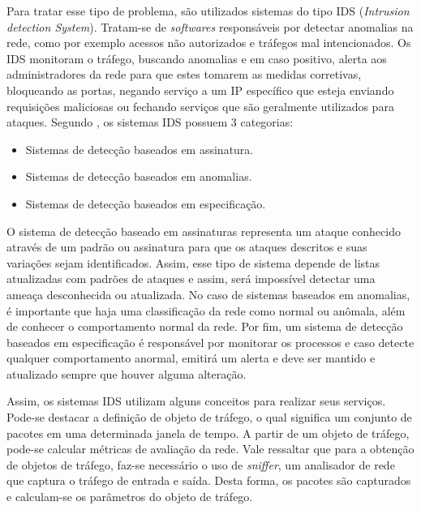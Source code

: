 Para tratar esse tipo de problema, são utilizados sistemas do tipo IDS (\textit{Intrusion detection System}). Tratam-se de \textit{softwares} responsáveis  por detectar anomalias na rede, como por exemplo acessos não autorizados e tráfegos mal intencionados. Os IDS monitoram o tráfego, buscando anomalias e em caso positivo, alerta aos administradores da rede para que estes tomarem as medidas corretivas, bloqueando as portas, negando serviço a um IP específico que esteja enviando requisições maliciosas ou fechando serviços que são geralmente utilizados para ataques. Segundo , os sistemas IDS possuem 3 categorias: 
\begin{itemize}
	\item Sistemas de detecção baseados em assinatura.
	\item Sistemas de detecção baseados em anomalias.
	\item Sistemas de detecção baseados em especificação.
\end{itemize}

O sistema de detecção baseado em assinaturas representa um ataque conhecido através de um padrão ou assinatura para que os ataques descritos e suas variações sejam identificados. Assim, esse tipo de sistema depende de listas atualizadas com padrões de ataques e assim, será impossível detectar uma ameaça desconhecida ou atualizada. No caso de sistemas baseados em anomalias, é importante que haja uma classificação da rede como normal ou anômala, além de conhecer o comportamento normal da rede. Por fim, um sistema de detecção baseados em especificação é responsável por monitorar os processos e caso detecte qualquer comportamento anormal, emitirá um alerta e deve ser mantido e atualizado sempre que houver alguma alteração.

Assim, os sistemas IDS utilizam alguns conceitos para realizar seus serviços. Pode-se destacar a definição de objeto de tráfego, o qual significa um conjunto de pacotes em uma determinada janela de tempo. A partir de um objeto de tráfego, pode-se calcular métricas de avaliação da rede. Vale ressaltar que para a obtenção de objetos de tráfego, faz-se necessário o uso de \textit{sniffer}, um analisador de rede que captura o tráfego de entrada e saída. Desta forma, os pacotes são capturados e calculam-se os parâmetros do objeto de tráfego.

